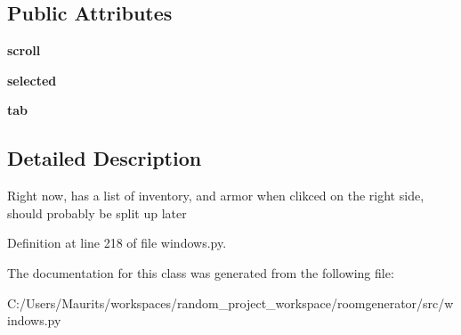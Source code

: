 \subsection*{Public Attributes}
\begin{DoxyCompactItemize}
\item 
\hypertarget{classwindows_1_1_inventory_window_aadb5cd90f6980eb79db2e46cb072c743}{}{\bfseries scroll}\label{classwindows_1_1_inventory_window_aadb5cd90f6980eb79db2e46cb072c743}

\item 
\hypertarget{classwindows_1_1_inventory_window_aa9901c0b1c67b1e7dc8b725986f18a2d}{}{\bfseries selected}\label{classwindows_1_1_inventory_window_aa9901c0b1c67b1e7dc8b725986f18a2d}

\item 
\hypertarget{classwindows_1_1_inventory_window_aa7d0ff071e6d8681ead5ff78517c27b3}{}{\bfseries tab}\label{classwindows_1_1_inventory_window_aa7d0ff071e6d8681ead5ff78517c27b3}

\end{DoxyCompactItemize}


\subsection{Detailed Description}
\begin{DoxyVerb}Right now, has a list of inventory, and armor when clikced on the right side, should probably be split up later\end{DoxyVerb}
 

Definition at line 218 of file windows.\+py.



The documentation for this class was generated from the following file\+:\begin{DoxyCompactItemize}
\item 
C\+:/\+Users/\+Maurits/workspaces/random\+\_\+project\+\_\+workspace/roomgenerator/src/windows.\+py\end{DoxyCompactItemize}
